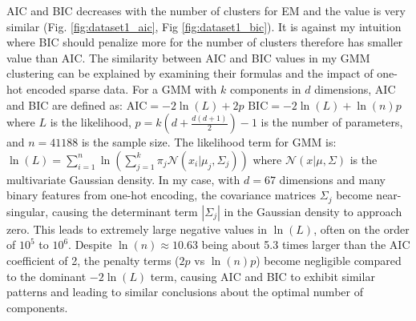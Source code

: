 \documentclass[conference]{IEEEtran}
\begin{document}
AIC and BIC decreases with the number of clusters for EM and the value is very similar (Fig. \ref{fig:dataset1_aic}, Fig \ref{fig:dataset1_bic}). It is against my intuition where BIC should penalize more for the number of clusters therefore has smaller value than AIC. The similarity between AIC and BIC values in my GMM clustering can be explained by examining their formulas and the impact of one-hot encoded sparse data. For a GMM with $k$ components in $d$ dimensions, AIC and BIC are defined as:
$\text{AIC} = -2\ln(L) + 2p$
$\text{BIC} = -2\ln(L) + \ln(n)p$
where $L$ is the likelihood, $p = k(d + \frac{d(d+1)}{2}) - 1$ is the number of parameters, and $n=41188$ is the sample size. The likelihood term for GMM is:
$\ln(L) = \sum_{i=1}^n \ln(\sum_{j=1}^k \pi_j \mathcal{N}(x_i|\mu_j,\Sigma_j))$
where $\mathcal{N}(x|\mu,\Sigma)$ is the multivariate Gaussian density. In my case, with $d=67$ dimensions and many binary features from one-hot encoding, the covariance matrices $\Sigma_j$ become near-singular, causing the determinant term $|\Sigma_j|$ in the Gaussian density to approach zero. This leads to extremely large negative values in $\ln(L)$, often on the order of $10^5$ to $10^6$. Despite $\ln(n) \approx 10.63$ being about 5.3 times larger than the AIC coefficient of 2, the penalty terms ($2p$ vs $\ln(n)p$) become negligible compared to the dominant $-2\ln(L)$ term, causing AIC and BIC to exhibit similar patterns and leading to similar conclusions about the optimal number of components. 
\end{document}
